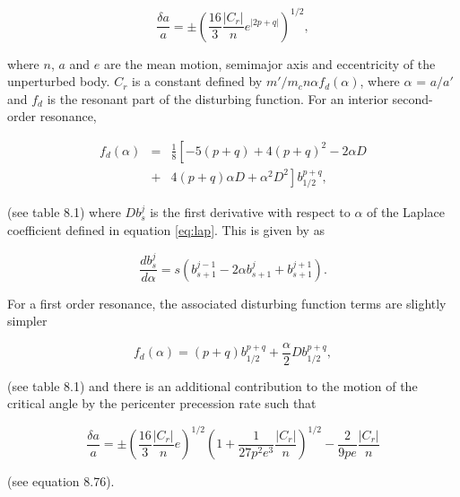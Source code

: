 \documentclass[twocolumn]{aastex63}
\begin{document}
\begin{equation}\label{eq:res_so}
	\frac{\delta a}{a} = \pm \left( \frac{16}{3} \frac{\left| C_{r} \right|}{n} e^{\left| 2 p + q \right|} \right)^{1/2},
\end{equation}

\noindent where $n$, $a$ and $e$ are the mean motion, semimajor axis and eccentricity of the unperturbed body. $C_{r}$ is a constant defined by 
$m'/m_{c} n \alpha f_{d}(\alpha)$, where $\alpha$ = $a/a'$ and $f_{d}$ is the resonant part of the disturbing function. For an interior second-order 
resonance,

\begin{eqnarray}\label{eq:fd_so}
	f_{d} (\alpha) &=& \frac{1}{8} \left[ -5(p+q) + 4(p+q)^{2} - 2 \alpha D \right. \\ \nonumber
	                      & + & \left. 4(p+q) \alpha D + \alpha^{2} D^{2} \right] b^{p+q}_{1/2},
\end{eqnarray}

\noindent (see \citet{2000ssd..book.....M} table 8.1) where $D b^{j}_{s}$ is the first derivative with respect to $\alpha$ of the Laplace coefficient defined in equation \ref{eq:lap}. This is given by \citet{1961mcm..book.....B} as

\begin{equation}\label{eq:lap_d}
	\frac{d b_{s}^{j}}{d \alpha} = s \left( b_{s+1}^{j-1} - 2 \alpha b_{s+1}^{j} + b_{s+1}^{j+1} \right).
\end{equation}

For a first order resonance, the associated disturbing function terms are slightly simpler

\begin{equation}\label{eq:fd_fo}
	f_{d}(\alpha) = (p+q) b_{1/2}^{p+q} + \frac{\alpha}{2} D b_{1/2}^{p+q},
\end{equation}

\noindent (see \citet{2000ssd..book.....M} table 8.1) and there is an additional contribution to the motion of the critical angle by the pericenter precession rate such that

\begin{equation}\label{eq:res_fo}
	\frac{\delta a}{a} = \pm \left(\frac{16}{3} \frac{\left| C_{r} \right|}{n} e \right)^{1/2} \left(  1 + \frac{1}{27 p^2 e^3} \frac{\left| C_{r} \right|}{n} 
	\right)^{1/2} - \frac{2}{9 p e}  \frac{\left| C_{r} \right|}{n}
\end{equation}

\noindent (see \citet{2000ssd..book.....M} equation 8.76).
\end{document}
